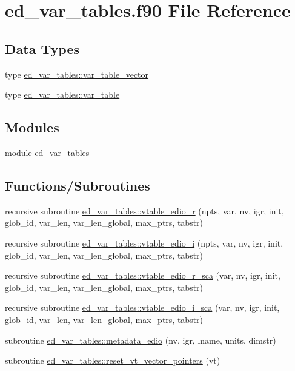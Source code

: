 \hypertarget{ed__var__tables_8f90}{}\section{ed\+\_\+var\+\_\+tables.\+f90 File Reference}
\label{ed__var__tables_8f90}
\subsection*{Data Types}
\begin{DoxyCompactItemize}
\item 
type \hyperlink{structed__var__tables_1_1var__table__vector}{ed\+\_\+var\+\_\+tables\+::var\+\_\+table\+\_\+vector}
\item 
type \hyperlink{structed__var__tables_1_1var__table}{ed\+\_\+var\+\_\+tables\+::var\+\_\+table}
\end{DoxyCompactItemize}
\subsection*{Modules}
\begin{DoxyCompactItemize}
\item 
module \hyperlink{namespaceed__var__tables}{ed\+\_\+var\+\_\+tables}
\end{DoxyCompactItemize}
\subsection*{Functions/\+Subroutines}
\begin{DoxyCompactItemize}
\item 
recursive subroutine \hyperlink{namespaceed__var__tables_af708758ab77f52cfcaf86b8e079d1ac6}{ed\+\_\+var\+\_\+tables\+::vtable\+\_\+edio\+\_\+r} (npts, var, nv, igr, init, glob\+\_\+id, var\+\_\+len, var\+\_\+len\+\_\+global, max\+\_\+ptrs, tabstr)
\item 
recursive subroutine \hyperlink{namespaceed__var__tables_ab691217cef9253738e526499e054a9d1}{ed\+\_\+var\+\_\+tables\+::vtable\+\_\+edio\+\_\+i} (npts, var, nv, igr, init, glob\+\_\+id, var\+\_\+len, var\+\_\+len\+\_\+global, max\+\_\+ptrs, tabstr)
\item 
recursive subroutine \hyperlink{namespaceed__var__tables_ab31d558ee32110b06b2fc41dd2e2070b}{ed\+\_\+var\+\_\+tables\+::vtable\+\_\+edio\+\_\+r\+\_\+sca} (var, nv, igr, init, glob\+\_\+id, var\+\_\+len, var\+\_\+len\+\_\+global, max\+\_\+ptrs, tabstr)
\item 
recursive subroutine \hyperlink{namespaceed__var__tables_a4a36c3fac62213e4eba4ffa37efbc3cc}{ed\+\_\+var\+\_\+tables\+::vtable\+\_\+edio\+\_\+i\+\_\+sca} (var, nv, igr, init, glob\+\_\+id, var\+\_\+len, var\+\_\+len\+\_\+global, max\+\_\+ptrs, tabstr)
\item 
subroutine \hyperlink{namespaceed__var__tables_a163fc43f01ed02a236a290d4b1d9575b}{ed\+\_\+var\+\_\+tables\+::metadata\+\_\+edio} (nv, igr, lname, units, dimstr)
\item 
subroutine \hyperlink{namespaceed__var__tables_aed76c1293872b5f6cf4c39c0747d2bb4}{ed\+\_\+var\+\_\+tables\+::reset\+\_\+vt\+\_\+vector\+\_\+pointers} (vt)
\end{DoxyCompactItemize}

